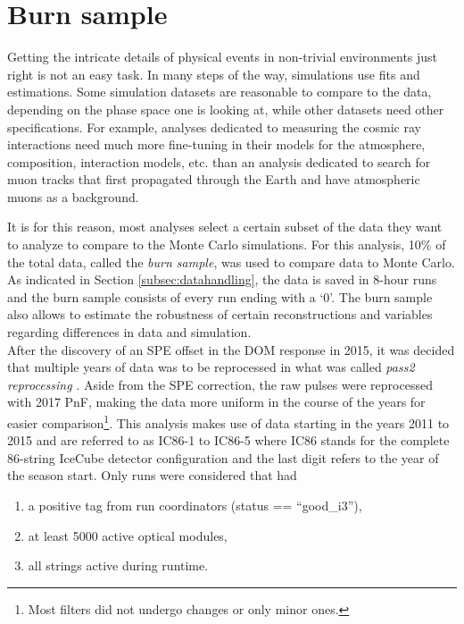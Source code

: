 \section{Burn sample}
\label{sec:burnsample}
Getting the intricate details of physical events in non-trivial environments just right is not an easy task. In many steps of the way, simulations use fits and estimations. Some simulation datasets are reasonable to compare to the data, depending on the phase space one is looking at, while other datasets need other specifications. For example, analyses dedicated to measuring the cosmic ray interactions need much more fine-tuning in their models for the atmosphere, composition, interaction models, etc. than an analysis dedicated to search for muon tracks that first propagated through the Earth and have atmospheric muons as a background.

It is for this reason, most analyses select a certain subset of the data they want to analyze to compare to the Monte Carlo simulations. For this analysis, 10\% of the total data, called the \textit{burn sample}, was used to compare data to Monte Carlo. As indicated in Section \ref{subsec:datahandling}, the data is saved in 8-hour runs and the burn sample consists of every run ending with a `0'. The burn sample also allows to estimate the robustness of certain reconstructions and variables regarding differences in data and simulation.\\

\noindent After the discovery of an SPE offset in the DOM response in 2015, it was decided that multiple years of data was to be reprocessed in what was called \textit{pass2 reprocessing} \cite{pass2}. Aside from the SPE correction, the raw pulses were reprocessed with 2017 PnF, making the data more uniform in the course of the years for easier comparison\footnote{Most filters did not undergo changes or only minor ones.}. This analysis makes use of data starting in the years 2011 to 2015 and are referred to as IC86-1 to IC86-5 where IC86 stands for the complete 86-string IceCube detector configuration and the last digit refers to the year of the season start. Only runs were considered that had

\begin{enumerate}
\item a positive tag from run coordinators (status == ``good\_i3''),
\item at least 5000 active optical modules,
\item all strings active during runtime.
\end{enumerate}

